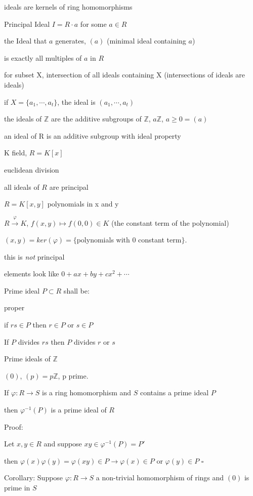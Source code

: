 \documentclass[12pt]{article}
\begin{document}
ideals are kernels of ring homomorphisms

\noindent
Principal Ideal $I = R \cdot a$ for some $a \in R$

the Ideal that $a$ generates, $(a)$ (minimal ideal containing $a$)

is exactly all multiples of $a$ in $R$

for subset X, intersection of all ideals containing X (intersections of ideals are ideals)

if $X = \{a_1, \cdots, a_t\}$, the ideal is $(a_1, \cdots, a_t)$

\noindent
the ideals of $\mathds{Z}$ are the additive subgroups of $\mathds{Z}$, $a\mathds{Z}$, $a \geq 0 = (a)$

an ideal of R is an additive subgroup with ideal property

\noindent
K field, $R = K[x]$

euclidean division

all ideals of $R$ are principal

\noindent
$R = K[x, y]$ polynomials in x and y

$R \xrightarrow{\varphi} K$, $f(x, y) \mapsto f(0, 0) \in K$ (the constant term of the polynomial)

$(x, y) = ker(\varphi) = \{$polynomials with 0 constant term$\}$.

this is \textit{not} principal

elements look like $0 + ax + by + cx^2 + \cdots$

\noindent
Prime ideal $P \subset R$ shall be:

proper

if $rs \in P$ then $r \in P$ or $s \in P$

If $P$ divides $rs$ then $P$ divides $r$ or $s$

\noindent
Prime ideals of $\mathds{Z}$

$(0)$, $(p) = p\mathds{Z}$, p prime.

\noindent
If $\varphi: R \to S$ is a ring homomorphism and $S$ contains a prime ideal $P$

then $\varphi^{-1}(P)$ is a prime ideal of $R$

\noindent
Proof:

Let $x, y \in R$ and suppose $xy \in \varphi^{-1}(P) = P'$

then $\varphi(x)\varphi(y) = \varphi(xy) \in P \to \varphi(x) \in P$ or $\varphi(y) \in P$ $\square$

\noindent
Corollary: Suppose $\varphi: R \to S$ a non-trivial homomorphism of rings and $(0)$ is prime in $S$
\end{document}
